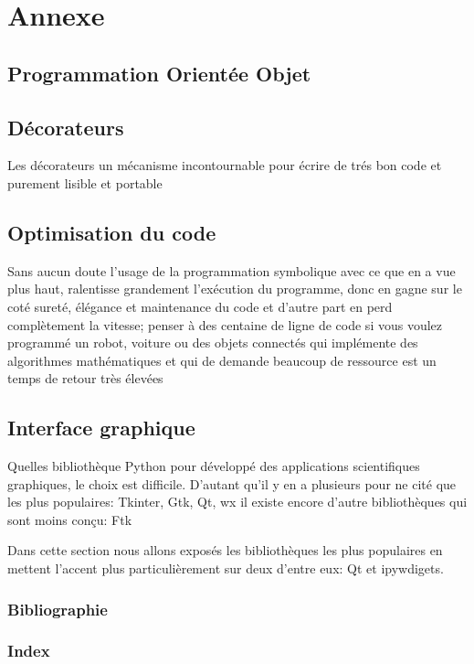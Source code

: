 \documentclass[11pt,fleqn]{book} %
\begin{document}
%





\part{Annexe}

\chapter{Programmation Orientée Objet}
\chapter{D\'ecorateurs}
Les d\'ecorateurs un m\'ecanisme incontournable pour \'ecrire de tr\'es bon code et purement 
lisible et portable
\chapter{Optimisation du code}
Sans aucun doute l'usage de la programmation symbolique avec ce que en a vue plus haut, ralentisse 
grandement l'exécution du programme, donc en gagne sur le coté sureté, élégance
et maintenance du code et d'autre part en perd complètement la vitesse; penser à des centaine de ligne 
de code si vous voulez programmé un robot, voiture ou des objets connectés qui implémente des 
algorithmes mathématiques et qui de demande beaucoup de ressource est un temps de retour très élevées 



\chapter{Interface graphique}
Quelles bibliothèque Python pour développé des applications scientifiques graphiques, le choix est 
difficile. D'autant qu'il y en a plusieurs pour ne cité que les plus populaires: Tkinter, Gtk, Qt, wx  
il existe encore d'autre bibliothèques qui sont moins con\c{c}u: Ftk 

Dans cette section nous allons exposés les bibliothèques les plus populaires en mettent l'accent plus particulièrement sur deux d'entre eux: Qt et ipywdigets. 

\section{Bibliographie}
\section{Index}
\end{document}
